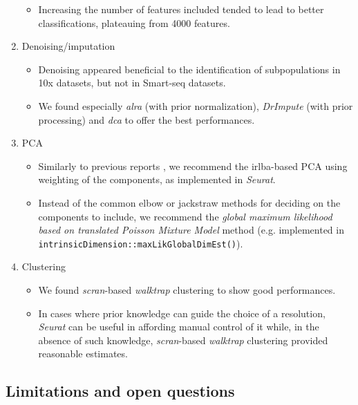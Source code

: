 \documentclass{bmcart}
\begin{document}
\begin{enumerate}
\begin{itemize}
     \item Increasing the number of features included tended to lead to better classifications, plateauing from 4000 features.
   \end{itemize}
   \item Denoising/imputation
   \begin{itemize}
       \item Denoising appeared beneficial to the identification of subpopulations in 10x datasets, but not in Smart-seq datasets.
       \item We found especially \textit{alra} (with prior normalization), \textit{DrImpute} (with prior processing) and \textit{dca} to offer the best performances.
   \end{itemize}
   \item PCA
   \begin{itemize}
     \item Similarly to previous reports \citep{SunDimRed2019}, we recommend the irlba-based PCA using weighting of the components, as implemented in \textit{Seurat}. 
     \item Instead of the common elbow or jackstraw methods for deciding on the components to include, we recommend the \textit{global maximum likelihood based on translated Poisson Mixture Model} method (e.g. implemented in \texttt{intrinsicDimension::maxLikGlobalDimEst()}).
   \end{itemize}
   \item Clustering
   \begin{itemize}
    \item We found \textit{scran}-based \textit{walktrap} clustering to show good performances.
    \item In cases where prior knowledge can guide the choice of a resolution, \textit{Seurat} can be useful in affording manual control of it while, in the absence of such knowledge, \textit{scran}-based \textit{walktrap} clustering provided reasonable estimates.
   \end{itemize}
\end{enumerate}



\subsection*{Limitations and open questions}
\end{document}
